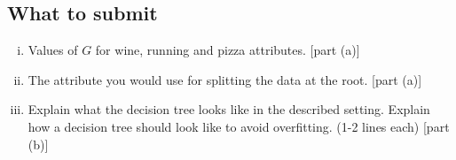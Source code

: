 \subsection*{What to submit}
\begin{enumerate}[(i)]
	\item Values of $G$ for wine, running and pizza attributes. [part (a)]
	\item The attribute you would use for splitting the data at the root. [part (a)]
	\item Explain what the decision tree looks like in the described setting. Explain how a decision tree should look like to avoid overfitting. (1-2 lines each) [part (b)]
\end{enumerate}


